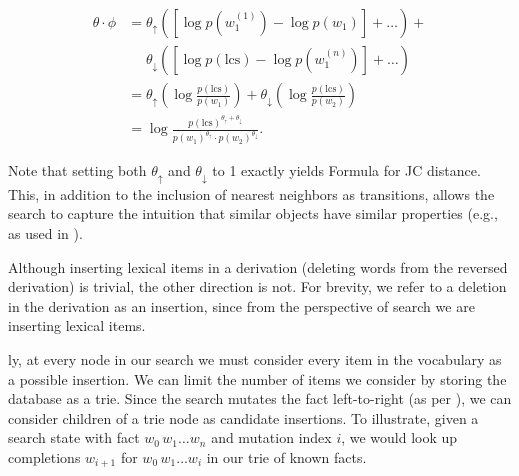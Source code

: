 \begin{align*}
\theta \cdot \phi
  &= \theta_\uparrow \left( 
    \left[\log p(w_1^{(1)}) - \log p(w_1)\right] +
    \dots
    \right) + \\
  &~~~~~~ \theta_\downarrow \left( 
    \left[\log p(\textrm{lcs}) - \log p(w_1^{(n)}) \right] +
    \dots
    \right) \\
  &= \theta_\uparrow \left( \log \frac{p(\textrm{lcs})}{p(w_1)} \right) +
     \theta_\downarrow \left( \log \frac{p(\textrm{lcs})}{p(w_2)} \right) \\
  &= \log \frac{ p(\textrm{lcs})^{\theta_\uparrow + \theta_\downarrow} }
               { p(w_1)^{\theta_\uparrow} \cdot p(w_2)^{\theta_\downarrow} }.
\end{align*}

Note that setting both $\theta_\uparrow$ and $\theta_\downarrow$ to 1 exactly
  yields Formula  for JC distance.
This, in addition to the inclusion of nearest neighbors as transitions,
  allows the search to capture the intuition that similar objects
  have similar properties
  (e.g., as used in ).
%


%
%
Although inserting lexical items in a derivation (deleting words from
  the reversed derivation) is trivial, the other direction is not.
For brevity, we refer to a deletion in the derivation as an insertion,
  since from the perspective of search we are inserting lexical items.

\Naive ly, at every node in our search we must consider every item in
  the vocabulary as a possible insertion.
We can limit the number of items we consider by storing the database
  as a trie.
Since the search mutates the fact left-to-right 
  (as per ), we can
  consider children of a trie node as candidate insertions.
To illustrate, given a search state with fact $w_0\,w_1 \dots w_n$
  and mutation index $i$, we would look up completions $w_{i+1}$ for
  $w_0\,w_1 \dots w_i$ in our trie of known facts.

